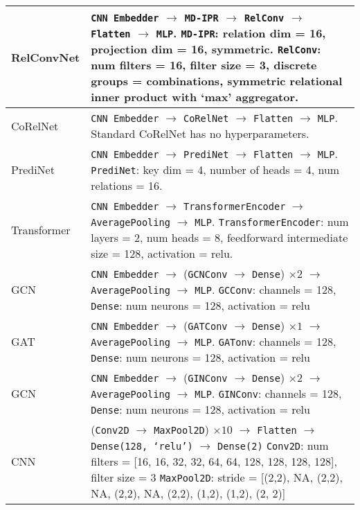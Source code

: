 \begin{tabular}{p{}p{}}
    RelConvNet        & 
        \texttt{CNN Embedder} $\to$ \texttt{MD-IPR} $\to$ \texttt{RelConv} $\to$ \texttt{Flatten} $\to$ \texttt{MLP}. \newline
        \texttt{MD-IPR}: relation dim = 16, projection dim = 16, symmetric. \newline
        \texttt{RelConv}: num filters = 16, filter size = 3, discrete groups = combinations, symmetric relational inner product with `max' aggregator. \\\hline
    CoRelNet          &
        \texttt{CNN Embedder} $\to$ \texttt{CoRelNet} $\to$ \texttt{Flatten} $\to$ \texttt{MLP}. \newline
        Standard CoRelNet has no hyperparameters. \\\hline
    PrediNet          &
        \texttt{CNN Embedder} $\to$ \texttt{PrediNet} $\to$ \texttt{Flatten} $\to$ \texttt{MLP}. \newline
        \texttt{PrediNet}: key dim = 4, number of heads = 4, num relations = 16. \\\hline
    Transformer       & 
        \texttt{CNN Embedder} $\to$ \texttt{TransformerEncoder} $\to$ \texttt{AveragePooling} $\to$ \texttt{MLP}. \newline
        \texttt{TransformerEncoder}: num layers = 2, num heads = 8, feedforward intermediate size = 128, activation = relu. \\\hline
    GCN               &
        \texttt{CNN Embedder} $\to$ (\texttt{GCNConv} $\to$ \texttt{Dense}) $\times 2$ $\to$ \texttt{AveragePooling} $\to$ \texttt{MLP}. \newline
        \texttt{GCConv}: channels = 128, \texttt{Dense}: num neurons = 128, activation = relu \\\hline
    GAT               &
        \texttt{CNN Embedder} $\to$ (\texttt{GATConv} $\to$ \texttt{Dense}) $\times 1$ $\to$ \texttt{AveragePooling} $\to$ \texttt{MLP}. \newline
        \texttt{GATonv}: channels = 128, \texttt{Dense}: num neurons = 128, activation = relu \\\hline
    GCN               &
        \texttt{CNN Embedder} $\to$ (\texttt{GINConv} $\to$ \texttt{Dense}) $\times 2$ $\to$ \texttt{AveragePooling} $\to$ \texttt{MLP}. \newline
        \texttt{GINConv}: channels = 128, \texttt{Dense}: num neurons = 128, activation = relu \\\hline
    CNN               &
        (\texttt{Conv2D} $\to$ \texttt{MaxPool2D}) $\times 10$ $\to$ \texttt{Flatten} $\to$ \texttt{Dense(128, `relu')} $\to$ \texttt{Dense(2)} \newline
        \texttt{Conv2D}: num filters = [16, 16, 32, 32, 64, 64, 128, 128, 128, 128], filter size = $3$ \newline
        \texttt{MaxPool2D}: stride = [(2,2), NA, (2,2), NA, (2,2), NA, (2,2), (1,2), (1,2), (2, 2)] \\ \bottomrule
\end{tabular}
